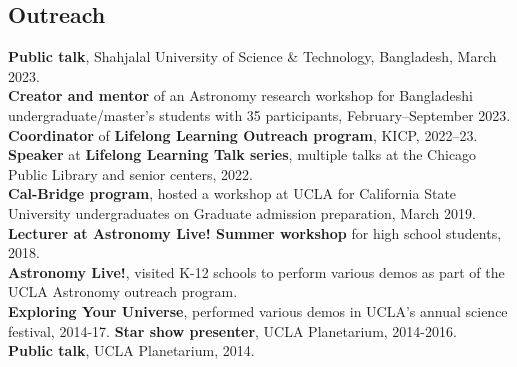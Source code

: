 \documentclass[margin, line]{res}
\begin{document}
\begin{resume}
\section{\sc Outreach}
{\bf Public talk}, Shahjalal University of Science \& Technology, Bangladesh, March 2023. \\
{\bf Creator and mentor} of an Astronomy research workshop for Bangladeshi undergraduate/master's students with 35 participants, February--September 2023. \\ 
{\bf Coordinator} of {\bf Lifelong Learning Outreach program}, KICP, 2022--23. \\
{\bf Speaker} at {\bf Lifelong Learning Talk series}, multiple talks at the Chicago Public Library and senior centers, 2022. \\
{\bf Cal-Bridge program}, hosted a workshop at UCLA for California State University undergraduates on Graduate admission preparation, March 2019. \\
{\bf Lecturer at Astronomy Live! Summer workshop} for high school students, 2018. \\
{\bf Astronomy Live!}, visited K-12 schools to perform various demos as part of the UCLA Astronomy outreach program. \\
{\bf Exploring Your Universe}, performed various demos in UCLA's annual science festival, 2014-17.
{\bf Star show presenter}, UCLA Planetarium, 2014-2016. \\
{\bf Public talk}, UCLA Planetarium, 2014. \\


\clearpage


\end{resume}
\end{document}

